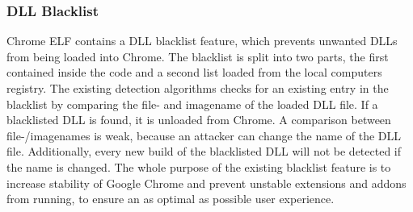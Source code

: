 \subsubsection{DLL Blacklist}
Chrome ELF contains a \gls{DLL} blacklist feature, which prevents unwanted \glspl{DLL} from being loaded into Chrome. The blacklist is split into two parts, the first contained inside the code and a second list loaded from the local computers registry. The existing detection algorithms checks for an existing entry in the blacklist by comparing the file- and imagename of the loaded \gls{DLL} file. If a blacklisted \gls{DLL} is found, it is unloaded from Chrome. A comparison between file-/imagenames is  weak, because an attacker can change the name of the \gls{DLL} file. Additionally, every new build of the blacklisted \gls{DLL} will not be detected if the name is changed. The whole purpose of the existing blacklist feature is to increase stability of Google Chrome and prevent unstable extensions and addons from running, to ensure an as optimal as possible user experience.